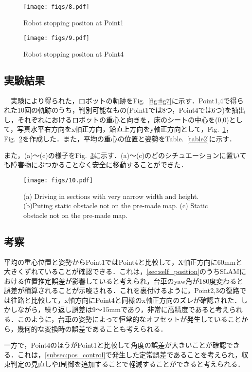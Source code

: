 \begin{figure}[!t]
\texttt{[image: figs/8.pdf]}
\caption{Robot stopping positon at Point1}
\label{fig:fig8}
\end{figure}

\begin{figure}[!t]
\texttt{[image: figs/9.pdf]}
\caption{Robot stopping positon at Point4}
\label{fig:fig9}
\end{figure}

\subsection{実験結果}
　実験により得られた，ロボットの軌跡をFig.~\ref{fig:fig7}に示す．Point1,4で得られた10回の軌跡のうち，判別可能なもの(Point1では8つ，Point4では6つ)を抽出し，それぞれにおけるロボットの重心と向きを，床のシートの中心を(0,0)として，写真水平右方向をx軸正方向，鉛直上方向をy軸正方向として，Fig.~\ref{fig:fig8}，Fig.~\ref{fig:fig9}を作成した．また，平均の重心の位置と姿勢をTable.~\ref{table2}に示す．

また，(a)〜(c)の様子をFig.~\ref{fig:fig10}に示す．(a)〜(c)のどのシチュエーションに置いても障害物にぶつかることなく安全に移動することができた．

\begin{figure}[!t]
\texttt{[image: figs/10.pdf]}
\caption{(a) Driving in sections with very narrow width and height. (b)Puting static obstacle not on the pre-made map. (c) Static obstacle not on the pre-made map.}
\label{fig:fig10}
\end{figure}

\subsection{考察}
平均の重心位置と姿勢からPoint1ではPoint4と比較して，X軸正方向に60mmと大きくずれていることが確認できる．これは，\ref{sec:self_position}のうちSLAMにおける位置推定誤差が影響していると考えられ，台車のyaw角が180度変わると誤差が積算されることが示唆される．これを裏付けるように，Point2,3の復路では往路と比較して，x軸方向にPoint4と同様のx軸正方向のズレが確認された．しかしながら，繰り返し誤差は9〜15mmであり，非常に高精度であると考えられる．このように，台車の姿勢によって恒常的なオフセットが発生していることから，幾何的な変換時の誤差であることも考えられる．

一方で，Point4のほうがPoint1と比較して角度の誤差が大きいことが確認できる．これは，\ref{subsec:pos_control}で発生した定常誤差であることを考えられ，収束判定の見直しやI制御を追加することで軽減することができると考えられる．

